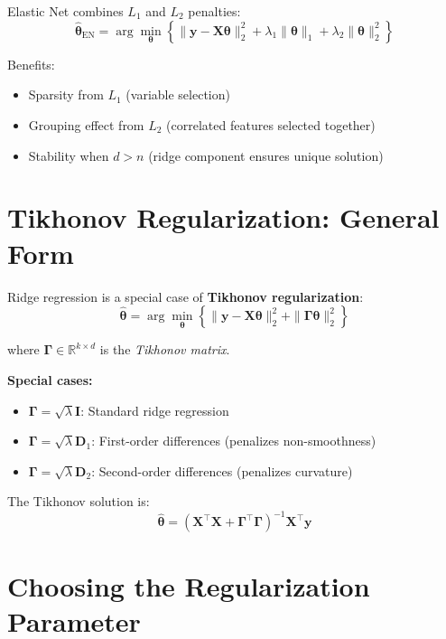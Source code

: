 \documentclass[main.tex]{subfiles}
\begin{document}
Elastic Net combines $L_1$ and $L_2$ penalties:
$$\hat{\boldsymbol{\theta}}_{\text{EN}} = \arg\min_{\boldsymbol{\theta}} \left\{ \|\mathbf{y} - \mathbf{X}\boldsymbol{\theta}\|_2^2 + \lambda_1\|\boldsymbol{\theta}\|_1 + \lambda_2\|\boldsymbol{\theta}\|_2^2 \right\}$$

Benefits:
\begin{itemize}
    \item Sparsity from $L_1$ (variable selection)
    \item Grouping effect from $L_2$ (correlated features selected together)
    \item Stability when $d > n$ (ridge component ensures unique solution)
\end{itemize}

\needspace{0.33\textheight}
\section{Tikhonov Regularization: General Form}

Ridge regression is a special case of \textbf{Tikhonov regularization}:
$$\hat{\boldsymbol{\theta}} = \arg\min_{\boldsymbol{\theta}} \left\{ \|\mathbf{y} - \mathbf{X}\boldsymbol{\theta}\|_2^2 + \|\boldsymbol{\Gamma}\boldsymbol{\theta}\|_2^2 \right\}$$

where $\boldsymbol{\Gamma} \in \mathbb{R}^{k \times d}$ is the \textit{Tikhonov matrix}. 

\textbf{Special cases:}
\begin{itemize}
    \item $\boldsymbol{\Gamma} = \sqrt{\lambda}\mathbf{I}$: Standard ridge regression
    \item $\boldsymbol{\Gamma} = \sqrt{\lambda}\mathbf{D}_1$: First-order differences (penalizes non-smoothness)
    \item $\boldsymbol{\Gamma} = \sqrt{\lambda}\mathbf{D}_2$: Second-order differences (penalizes curvature)
\end{itemize}

\begin{theorem}
The Tikhonov solution is:
$$\hat{\boldsymbol{\theta}} = (\mathbf{X}^\top\mathbf{X} + \boldsymbol{\Gamma}^\top\boldsymbol{\Gamma})^{-1}\mathbf{X}^\top\mathbf{y}$$
\end{theorem}

\needspace{0.33\textheight}
\section{Choosing the Regularization Parameter}
\end{document}
